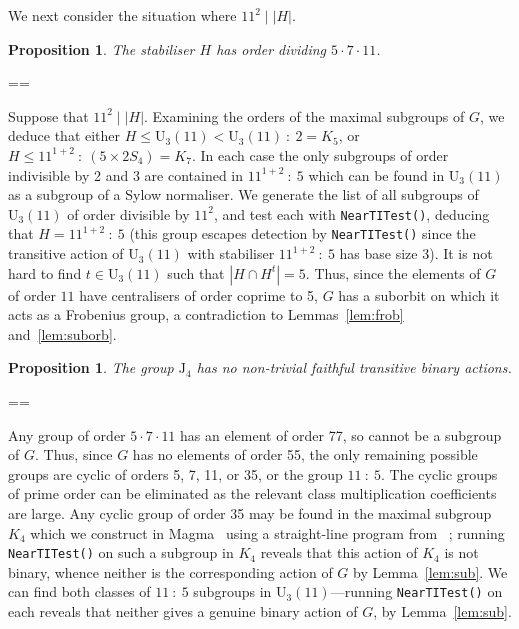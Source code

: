 \documentclass[11pt, a4paper]{amsart}
\makeatletter
\newcommand{\magma}{{\sc Magma}}
\def\cn{\mathord{{\!\:{:}\:\!}}}
\newtheorem{prop}[thm]{Proposition}
\renewcommand{\proofname}{Proof}
\renewenvironment{proof}[1][\proofname]{\par
  \pushQED{\qed}  \normalfont \partopsep=\z@skip \topsep=\z@skip
  \trivlist
  \item[\hskip\labelsep
        \scshape
    #1\@addpunct{.}]\ignorespaces
}{  \popQED\endtrivlist\@endpefalse
}
\makeatother
\begin{document}
We next consider the situation where $11^{2}\mid |H|$. 
\begin{prop}
    The stabiliser $H$ has order dividing $ 5\cdot7\cdot 11$.
\end{prop}
\begin{proof}
    Suppose that $11^2\mid |H|$. Examining the orders of the maximal subgroups of $G$, we deduce that either $H\leq\mathrm{U}_{3}(11)<\mathrm{U}_3(11)\cn 2=K_5$, or $H\leq 11^{1+2}\cn(5\times2S_4)=K_7$. In each case the only subgroups of order indivisible by 2 and 3 are contained in $11^{1+2}\cn5$ which can be found in $\mathrm{U}_3(11)$ as a subgroup of a Sylow normaliser. We generate the list of all subgroups of $\mathrm{U}_{3}(11)$ of order divisible by $11^2$, and test each with {\tt{NearTITest()}}, deducing that $H=11^{1+2}\cn5$ (this group escapes detection by {\tt{NearTITest()}} since the transitive action of $\mathrm{U}_{3}(11)$ with stabiliser $11^{1+2}\cn5$ has base size 3). It is not hard to find $t\in\mathrm{U}_{3}(11)$ such that $|H\cap H^t|=5$. Thus, since the elements of $G$ of order $11$ have centralisers of order coprime to 5, $G$ has a suborbit on which it acts as a Frobenius group, a contradiction to Lemmas~\ref{lem:frob} and~\ref{lem:suborb}. 
\end{proof}
\begin{prop}
    The group $\mathrm{J}_4$ has no non-trivial faithful transitive binary actions.
\end{prop}
\begin{proof}
    Any group of order $5\cdot7\cdot11$ has an element of order 77, so cannot be a subgroup of $G$. Thus, since $G$ has no elements of order 55, the only remaining possible groups are cyclic of orders 5, 7, 11, or 35, or the group $11\cn5$. The cyclic groups of prime order can be eliminated as the relevant class multiplication coefficients are large. Any cyclic group of order 35 may be found in the maximal subgroup $K_4$ which we construct in \magma~\cite{magma} using a straight-line program from ~\cite{webatlas}; running {\tt{NearTITest()}} on such a subgroup in $K_4$ reveals that this action of $K_4$ is not binary, whence neither is the corresponding action of $G$ by Lemma~\ref{lem:sub}. We can find both classes of $11\cn5$ subgroups in $\mathrm{U}_{3}(11)$---running {\tt{NearTITest()}} on each reveals that neither gives a genuine binary action of $G$, by Lemma~\ref{lem:sub}.
\end{proof}
\end{document}
